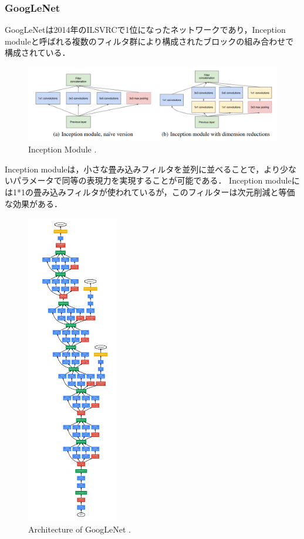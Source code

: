 \subsubsection{GoogLeNet}
    GoogLeNet\cite{szegedy2015going}は2014年のILSVRCで1位になったネットワークであり，Inception moduleと呼ばれる複数のフィルタ群により構成されたブロックの組み合わせで構成されている．
    \begin{figure}[ht]
      \centering
      \includegraphics[width=14cm]{8_appendix/img/Inception_module.png}
      \caption{Inception Module \cite{szegedy2015going}.}
    \end{figure}
    Inception moduleは，小さな畳み込みフィルタを並列に並べることで，より少ないパラメータで同等の表現力を実現することが可能である．
    Inception moduleには1*1の畳み込みフィルタが使われているが，このフィルターは次元削減と等価な効果がある．
    \begin{figure}[ht]
      \centering
      \includegraphics[width=4cm, angle=-90]{8_appendix/img/googlenet.png}
      \caption{Architecture of GoogLeNet \cite{szegedy2015going}.}
    \end{figure}
    
